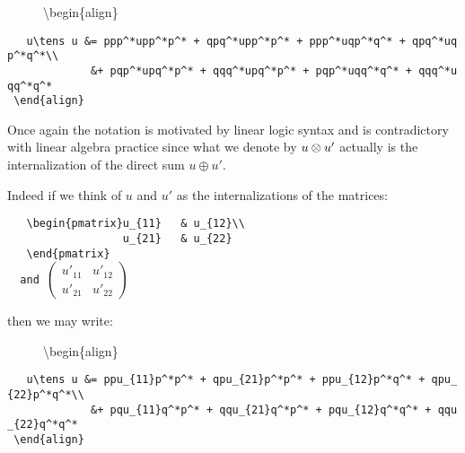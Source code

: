 \begin{description}
\item[]
\textbackslash{}begin\{align\}
\end{description}

\texttt{~~~u\textbackslash{}tens~u\textquotesingle{}~\&=~ppp\^{}*upp\^{}*p\^{}*~+~qpq\^{}*upp\^{}*p\^{}*~+~ppp\^{}*uqp\^{}*q\^{}*~+~qpq\^{}*uqp\^{}*q\^{}*\textbackslash{}\textbackslash{}}\\
\texttt{~~~~~~~~~~~~~\&+~pqp\^{}*u\textquotesingle{}pq\^{}*p\^{}*~+~qqq\^{}*u\textquotesingle{}pq\^{}*p\^{}*~+~pqp\^{}*u\textquotesingle{}qq\^{}*q\^{}*~+~qqq\^{}*u\textquotesingle{}qq\^{}*q\^{}*}\\
\texttt{~\textbackslash{}end\{align\}}

Once again the notation is motivated by linear logic syntax and is
contradictory with linear algebra practice since what we denote by
\(u\otimes u'\) actually is the internalization of the direct sum
\(u\oplus u'\).

Indeed if we think of \(u\) and \(u'\) as the internalizations of the
matrices:

\begin{description}
\item[]
\end{description}

\texttt{~~~\textbackslash{}begin\{pmatrix\}u\_\{11\}~~~\&~u\_\{12\}\textbackslash{}\textbackslash{}}\\
\texttt{~~~~~~~~~~~~~~~~~~u\_\{21\}~~~\&~u\_\{22\}}\\
\texttt{~~~\textbackslash{}end\{pmatrix\}}\\
\texttt{~}\texttt{~and~}\(\begin{pmatrix}u'_{11} & u'_{12}\\
                   u'_{21} & u'_{22}
    \end{pmatrix}\)

then we may write:

\begin{description}
\item[]
\textbackslash{}begin\{align\}
\end{description}

\texttt{~~~u\textbackslash{}tens~u\textquotesingle{}~\&=~ppu\_\{11\}p\^{}*p\^{}*~+~qpu\_\{21\}p\^{}*p\^{}*~+~ppu\_\{12\}p\^{}*q\^{}*~+~qpu\_\{22\}p\^{}*q\^{}*\textbackslash{}\textbackslash{}}\\
\texttt{~~~~~~~~~~~~~\&+~pqu\textquotesingle{}\_\{11\}q\^{}*p\^{}*~+~qqu\textquotesingle{}\_\{21\}q\^{}*p\^{}*~+~pqu\textquotesingle{}\_\{12\}q\^{}*q\^{}*~+~qqu\textquotesingle{}\_\{22\}q\^{}*q\^{}*}\\
\texttt{~\textbackslash{}end\{align\}}

